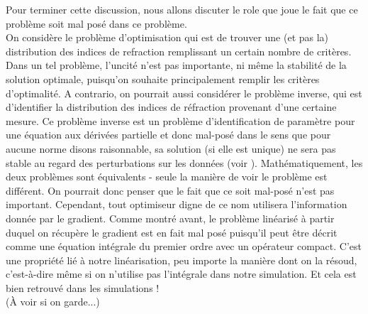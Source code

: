 \documentclass{article}
\begin{document}
Pour terminer cette discussion, nous allons discuter le role que joue le fait que ce problème soit mal posé dans ce problème.\\
On considère le problème d'optimisation qui est de trouver une (et pas la) distribution des indices de refraction remplissant un certain nombre de critères. Dans un tel problème, l'uncité n'est pas importante, ni même la stabilité de la solution optimale, puisqu'on souhaite principalement remplir les critères d'optimalité. A contrario, on pourrait aussi considérer le problème inverse, qui est d'identifier la distribution des indices de réfraction provenant d'une certaine mesure. Ce problème inverse est un problème d'identification de paramètre pour une équation aux dérivées partielle et donc mal-posé dans le sens que pour aucune norme disons raisonnable, sa solution (si elle est unique) ne sera pas stable au regard des perturbations sur les données (voir \cite{engl96regu}). Mathématiquement, les deux problèmes sont équivalents - seule la manière de voir le problème est différent. 
On pourrait donc penser que le fait que ce soit mal-posé n'est pas important. Cependant, tout optimiseur digne de ce nom utilisera l'information donnée par le gradient. Comme montré avant, le problème linéarisé à partir duquel on récupère le gradient est en fait mal posé puisqu'il peut être décrit comme une équation intégrale du premier ordre avec un opérateur compact. 
C'est une propriété lié à notre linéarisation, peu importe la manière dont on la résoud, c'est-à-dire même si on n'utilise pas l'intégrale dans notre simulation. Et cela est bien retrouvé dans les simulations !\\
(À voir si on garde...)
\end{document}
